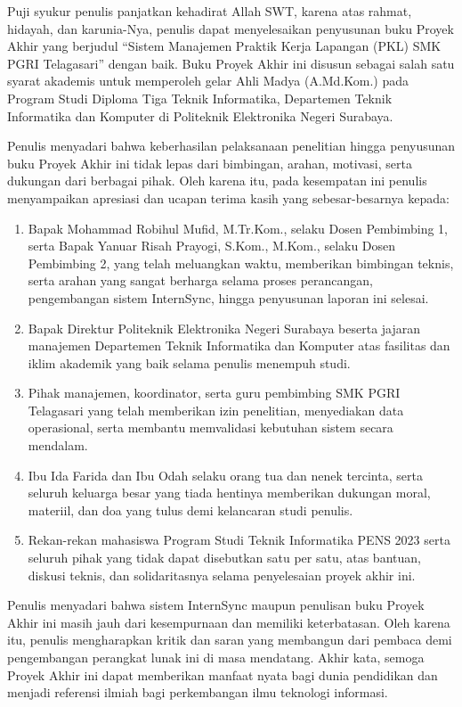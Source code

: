 
Puji syukur penulis panjatkan kehadirat Allah SWT, karena atas rahmat, hidayah, dan karunia-Nya, penulis dapat menyelesaikan penyusunan buku Proyek Akhir yang berjudul “Sistem Manajemen Praktik Kerja Lapangan (PKL) SMK PGRI Telagasari” dengan baik. Buku Proyek Akhir ini disusun sebagai salah satu syarat akademis untuk memperoleh gelar Ahli Madya (A.Md.Kom.) pada Program Studi Diploma Tiga Teknik Informatika, Departemen Teknik Informatika dan Komputer di Politeknik Elektronika Negeri Surabaya.

Penulis menyadari bahwa keberhasilan pelaksanaan penelitian hingga penyusunan buku Proyek Akhir ini tidak lepas dari bimbingan, arahan, motivasi, serta dukungan dari berbagai pihak. Oleh karena itu, pada kesempatan ini penulis menyampaikan apresiasi dan ucapan terima kasih yang sebesar-besarnya kepada:

\begin{enumerate}[label=\arabic*.]
\item Bapak Mohammad Robihul Mufid, M.Tr.Kom., selaku Dosen Pembimbing 1, serta Bapak Yanuar Risah Prayogi, S.Kom., M.Kom., selaku Dosen Pembimbing 2, yang telah meluangkan waktu, memberikan bimbingan teknis, serta arahan yang sangat berharga selama proses perancangan, pengembangan sistem InternSync, hingga penyusunan laporan ini selesai.
\item Bapak Direktur Politeknik Elektronika Negeri Surabaya beserta jajaran manajemen Departemen Teknik Informatika dan Komputer atas fasilitas dan iklim akademik yang baik selama penulis menempuh studi.
\item Pihak manajemen, koordinator, serta guru pembimbing SMK PGRI Telagasari yang telah memberikan izin penelitian, menyediakan data operasional, serta membantu memvalidasi kebutuhan sistem secara mendalam.
\item Ibu Ida Farida dan Ibu Odah selaku orang tua dan nenek tercinta, serta seluruh keluarga besar yang tiada hentinya memberikan dukungan moral, materiil, dan doa yang tulus demi kelancaran studi penulis.
\item Rekan-rekan mahasiswa Program Studi Teknik Informatika PENS 2023 serta seluruh pihak yang tidak dapat disebutkan satu per satu, atas bantuan, diskusi teknis, dan solidaritasnya selama penyelesaian proyek akhir ini.
\end{enumerate}

Penulis menyadari bahwa sistem InternSync maupun penulisan buku Proyek Akhir ini masih jauh dari kesempurnaan dan memiliki keterbatasan. Oleh karena itu, penulis mengharapkan kritik dan saran yang membangun dari pembaca demi pengembangan perangkat lunak ini di masa mendatang. Akhir kata, semoga Proyek Akhir ini dapat memberikan manfaat nyata bagi dunia pendidikan dan menjadi referensi ilmiah bagi perkembangan ilmu teknologi informasi.

